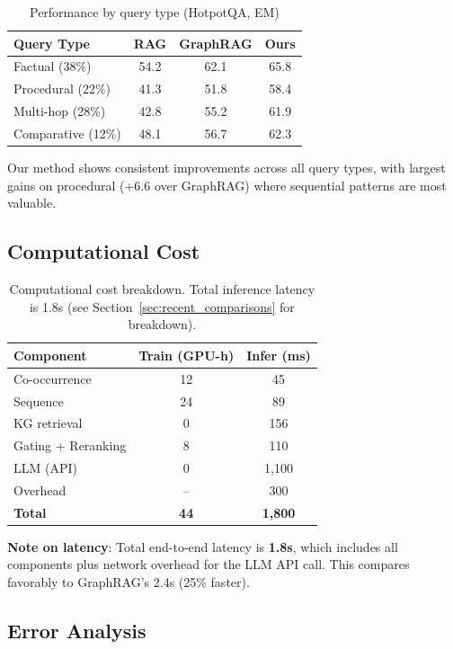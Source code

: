 \documentclass[10pt,twocolumn]{article}
\begin{document}
\begin{table}[h]
\centering
\caption{Performance by query type (HotpotQA, EM)}
\label{tab:query_type_perf}
\small
\begin{tabular}{@{}lccc@{}}
\toprule
\textbf{Query Type} & \textbf{RAG} & \textbf{GraphRAG} & \textbf{Ours} \\
\midrule
Factual (38\%) & 54.2 & 62.1 & 65.8 \\
Procedural (22\%) & 41.3 & 51.8 & 58.4 \\
Multi-hop (28\%) & 42.8 & 55.2 & 61.9 \\
Comparative (12\%) & 48.1 & 56.7 & 62.3 \\
\bottomrule
\end{tabular}
\end{table}

Our method shows consistent improvements across all query types, with largest gains on procedural (+6.6 over GraphRAG) where sequential patterns are most valuable.


\subsection{Computational Cost}

\begin{table}[t]
\centering
\caption{Computational cost breakdown. Total inference latency is 1.8s (see Section~\ref{sec:recent_comparisons} for breakdown).}
\label{tab:cost}
\small
\begin{tabular}{@{}lcc@{}}
\toprule
\textbf{Component} & \textbf{Train (GPU-h)} & \textbf{Infer (ms)} \\
\midrule
Co-occurrence & 12 & 45 \\
Sequence & 24 & 89 \\
KG retrieval & 0 & 156 \\
Gating + Reranking & 8 & 110 \\
LLM (API) & 0 & 1,100 \\
Overhead & -- & 300 \\
\midrule
\textbf{Total} & \textbf{44} & \textbf{1,800} \\
\bottomrule
\end{tabular}
\end{table}

\textbf{Note on latency}: Total end-to-end latency is \textbf{1.8s}, which includes all components plus network overhead for the LLM API call. This compares favorably to GraphRAG's 2.4s (25\% faster).

\subsection{Error Analysis}
\end{document}
